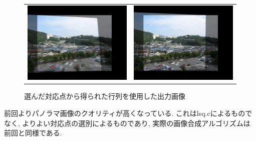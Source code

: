 \documentclass[a4j]{jarticle}
\begin{document}
\begin{figure}[h]
\begin{tabular}{cc}
\begin{minipage}{0.5\hsize}
\center
\includegraphics[bb=0 0 1024 768,scale=.2]{../2/panoout.jpg}
\caption{前回の出力画像}
\end{minipage}&
\begin{minipage}{0.5\hsize}
\center
\includegraphics[bb=0 0 1024 768,scale=.2]{../3/out.jpg}
\caption{選んだ対応点から得られた行列を使用した出力画像}
\end{minipage}
\end{tabular}
\end{figure}

前回よりパノラマ画像のクオリティが高くなっている.
これはlsq.cによるものでなく, よりよい対応点の選別によるものであり, 
実際の画像合成アルゴリズムは前回と同様である. 
\end{document}
